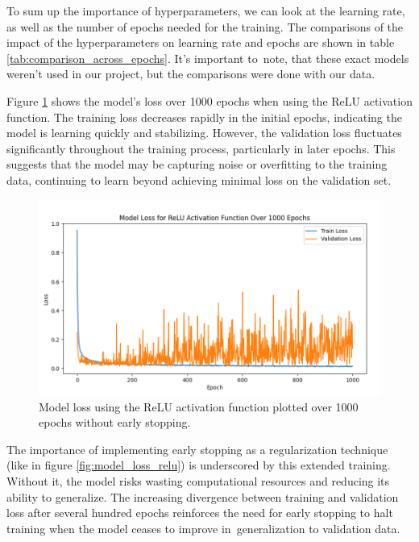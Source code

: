 To sum up the importance of hyperparameters, we can look at the learning rate, as well as the number of epochs needed for the training. The comparisons of the impact of the hyperparameters on learning rate and epochs are shown in table \ref{tab:comparison_across_epochs}. It's important to~note, that these exact models weren't used in our project, but the comparisons were done with our data.



Figure \ref{fig:epochs} shows the model's loss over 1000 epochs when using the ReLU activation function. The training loss decreases rapidly in the initial epochs, indicating the model is learning quickly and stabilizing. However, the validation loss fluctuates significantly throughout the training process, particularly in later epochs. This suggests that the model may be capturing noise or overfitting to the training data, continuing to learn beyond achieving minimal loss on the validation set.


\begin{figure}[ht!]
	\centering
	\includegraphics[width=\textwidth]{images/model_loss_over_1000_epochs.png}
	\caption{Model loss using the ReLU activation function plotted over 1000 epochs without early stopping.}
	\label{fig:epochs}
\end{figure}



The importance of implementing early stopping as a regularization technique (like in figure \ref{fig:model_loss_relu}) is underscored by this extended training. Without it, the model risks wasting computational resources and reducing its ability to generalize. The increasing divergence between training and validation loss after several hundred epochs reinforces the need for early stopping to halt training when the model ceases to improve in~generalization to validation data.

